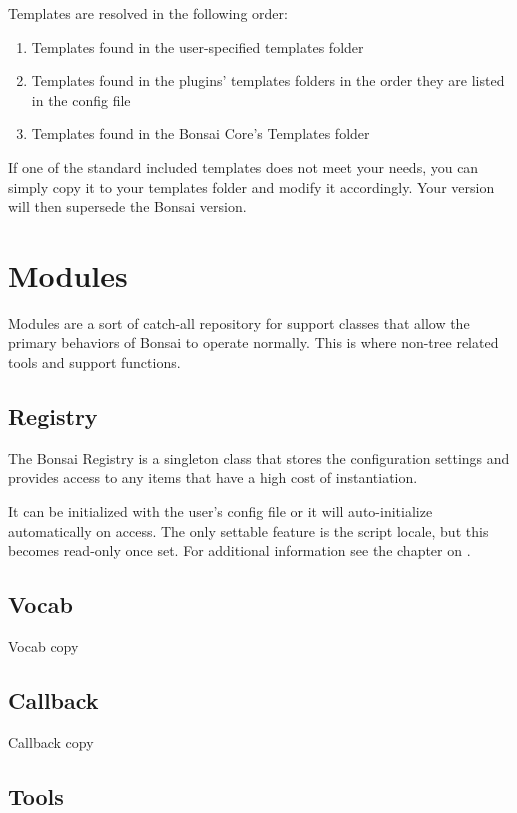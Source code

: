 \documentclass[]{book}
\begin{document}
Templates are resolved in the following order:

\begin{enumerate}
	\item Templates found in the user-specified templates folder
	\item Templates found in the plugins' templates folders in the order they are listed in the config file
	\item Templates found in the Bonsai Core's Templates folder
\end{enumerate}

If one of the standard included templates does not meet your needs, you can simply copy it to your templates folder and modify it accordingly. Your version will then supersede the Bonsai version.

\section{Modules}

Modules are a sort of catch-all repository for support classes that allow the primary behaviors of Bonsai to operate normally. This is where non-tree related tools and support functions.

\subsection{Registry}

The Bonsai Registry is a singleton class that stores the configuration settings and provides access to any items that have a high cost of instantiation.

It can be initialized with the user's config file or it will auto-initialize automatically on access. The only settable feature is the script locale, but this becomes read-only once set. For additional information see the chapter on .

\subsection{Vocab}

Vocab copy

\subsection{Callback}

Callback copy

\subsection{Tools}
\end{document}
